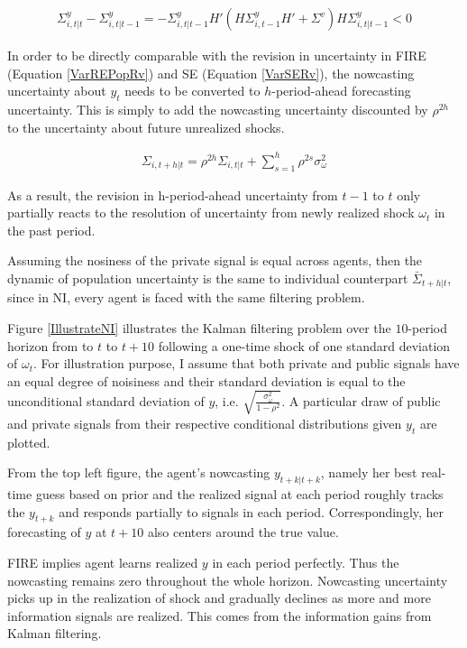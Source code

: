 \documentclass[12pt]{article}
\begin{document}
	\begin{eqnarray}\label{VarNIRv}
		\Sigma^y_{i,t|t} - \Sigma^y_{i,t|t-1} = - \Sigma^y_{i,t|t-1} H'(H \Sigma^y_{i,t-1} H' +\Sigma^v) H \Sigma^y_{i,t|t-1} <0
	\end{eqnarray}
	
	In order to be directly comparable with the revision in uncertainty in FIRE (Equation \ref{VarREPopRv}) and SE (Equation \ref{VarSERv}), the nowcasting uncertainty about $y_t$ needs to be converted to $h$-period-ahead forecasting uncertainty. This is simply to add the nowcasting uncertainty discounted by $\rho^{2h}$ to the uncertainty about future unrealized shocks.   
	
	\begin{eqnarray}\label{VarNIEq}
		\Sigma_{i,t+h|t} = \rho^{2h} \Sigma_{i,t|t} + \sum^{h}_{s=1}\rho^{2s} \sigma^2_{\omega}
	\end{eqnarray}
	
	As a result, the revision in h-period-ahead uncertainty from $t-1$ to $t$ only partially reacts to the resolution of  uncertainty from newly realized shock $\omega_t$ in the past period. 
	
	Assuming the nosiness of the private signal is equal across agents, then the dynamic of population uncertainty is the same to individual counterpart $\bar \Sigma_{t+h|t}$, since in NI, every agent is faced with the same filtering problem.  
	
	Figure \ref{IllustrateNI} illustrates the Kalman filtering problem over the $10$-period horizon from to $t$ to $t+10$  following a one-time shock of one standard deviation of $\omega_t$.  For illustration purpose, I assume that both private and public signals have an equal degree of noisiness and their standard deviation is equal to the unconditional standard deviation of $y$, i.e. $\sqrt{\frac{\sigma^2_\omega}{1-\rho^2}}$.  A particular draw of public and private signals from their respective conditional distributions given $y_t$ are plotted.    
	
	From the top left figure, the agent's nowcasting $y_{t+k|t+k}$, namely her best real-time guess based on prior and the realized signal at each period roughly tracks the $y_{t+k}$ and responds partially to signals in each period. Correspondingly, her forecasting of $y$ at $t+10$ also centers around the true value. 
	
	FIRE implies agent learns realized $y$ in each period perfectly. Thus the nowcasting remains zero throughout the whole horizon. Nowcasting uncertainty picks up in the realization of shock and gradually declines as more and more information signals are realized. This comes from the information gains from Kalman filtering. 
	
\end{document}
